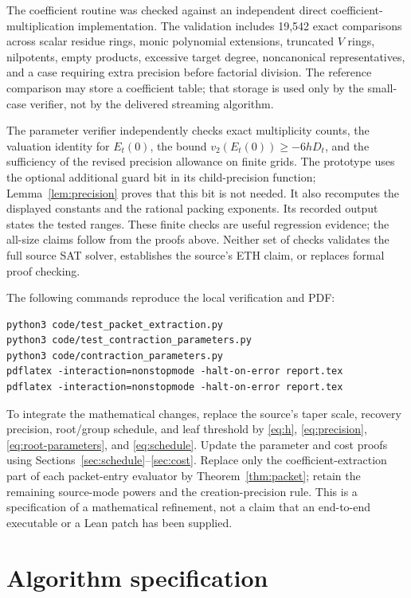 \documentclass[11pt]{article}
\theoremstyle{remark}
\newcommand{\vTwo}{v_2}
\begin{document}
The coefficient routine was checked against an independent direct coefficient-multiplication implementation. The validation includes 19,542 exact comparisons across scalar residue rings, monic polynomial extensions, truncated $V$ rings, nilpotents, empty products, excessive target degree, noncanonical representatives, and a case requiring extra precision before factorial division. The reference comparison may store a coefficient table; that storage is used only by the small-case verifier, not by the delivered streaming algorithm.

The parameter verifier independently checks exact multiplicity counts, the valuation identity for $E_t(0)$, the bound $\vTwo(E_t(0))\ge-6hD_t$, and the sufficiency of the revised precision allowance on finite grids. The prototype uses the optional additional guard bit in its child-precision function; Lemma~\ref{lem:precision} proves that this bit is not needed. It also recomputes the displayed constants and the rational packing exponents. Its recorded output states the tested ranges. These finite checks are useful regression evidence; the all-size claims follow from the proofs above. Neither set of checks validates the full source SAT solver, establishes the source's ETH claim, or replaces formal proof checking.

The following commands reproduce the local verification and PDF:
\begin{verbatim}
python3 code/test_packet_extraction.py
python3 code/test_contraction_parameters.py
python3 code/contraction_parameters.py
pdflatex -interaction=nonstopmode -halt-on-error report.tex
pdflatex -interaction=nonstopmode -halt-on-error report.tex
\end{verbatim}

To integrate the mathematical changes, replace the source's taper scale, recovery precision, root/group schedule, and leaf threshold by \eqref{eq:h}, \eqref{eq:precision}, \eqref{eq:root-parameters}, and \eqref{eq:schedule}. Update the parameter and cost proofs using Sections~\ref{sec:schedule}--\ref{sec:cost}. Replace only the coefficient-extraction part of each packet-entry evaluator by Theorem~\ref{thm:packet}; retain the remaining source-mode powers and the creation-precision rule. This is a specification of a mathematical refinement, not a claim that an end-to-end executable or a Lean patch has been supplied.

\appendix
\section{Algorithm specification}
\end{document}
